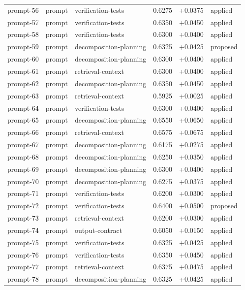 \begin{center}
\begin{longtable}{llp{5.2cm}rrl}
prompt-56 & prompt & verification-tests & 0.6275 & +0.0375 & applied \\
prompt-57 & prompt & verification-tests & 0.6350 & +0.0450 & applied \\
prompt-58 & prompt & verification-tests & 0.6300 & +0.0400 & applied \\
prompt-59 & prompt & decomposition-planning & 0.6325 & +0.0425 & proposed \\
prompt-60 & prompt & decomposition-planning & 0.6300 & +0.0400 & applied \\
prompt-61 & prompt & retrieval-context & 0.6300 & +0.0400 & applied \\
prompt-62 & prompt & decomposition-planning & 0.6350 & +0.0450 & applied \\
prompt-63 & prompt & retrieval-context & 0.5925 & +0.0025 & applied \\
prompt-64 & prompt & verification-tests & 0.6300 & +0.0400 & applied \\
prompt-65 & prompt & decomposition-planning & 0.6550 & +0.0650 & applied \\
prompt-66 & prompt & retrieval-context & 0.6575 & +0.0675 & applied \\
prompt-67 & prompt & decomposition-planning & 0.6175 & +0.0275 & applied \\
prompt-68 & prompt & decomposition-planning & 0.6250 & +0.0350 & applied \\
prompt-69 & prompt & decomposition-planning & 0.6300 & +0.0400 & applied \\
prompt-70 & prompt & decomposition-planning & 0.6275 & +0.0375 & applied \\
prompt-71 & prompt & verification-tests & 0.6200 & +0.0300 & applied \\
prompt-72 & prompt & verification-tests & 0.6400 & +0.0500 & proposed \\
prompt-73 & prompt & retrieval-context & 0.6200 & +0.0300 & applied \\
prompt-74 & prompt & output-contract & 0.6050 & +0.0150 & applied \\
prompt-75 & prompt & verification-tests & 0.6325 & +0.0425 & applied \\
prompt-76 & prompt & verification-tests & 0.6350 & +0.0450 & applied \\
prompt-77 & prompt & retrieval-context & 0.6375 & +0.0475 & applied \\
prompt-78 & prompt & decomposition-planning & 0.6325 & +0.0425 & applied \\

\end{longtable}
\end{center}
